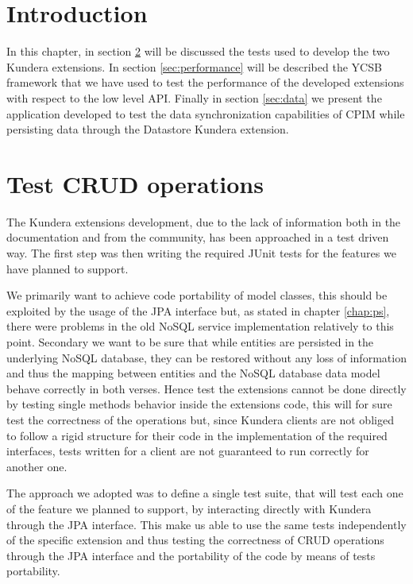 \section{Introduction}
In this chapter, in section \ref{sec:crud} will be discussed the tests used to develop the two Kundera extensions.
In section \ref{sec:performance} will be described the YCSB framework that we have used to test the performance of the developed extensions with respect to the low level API.
Finally in section \ref{sec:data} we present the application developed to test the data synchronization capabilities of CPIM while persisting data through the Datastore Kundera extension. 

\section{Test CRUD operations}
\label{sec:crud}
The Kundera extensions development, due to the lack of information both in the documentation and from the community, has been approached in a test driven way.
The first step was then writing the required JUnit tests for the features we have planned to support.

\newparagraph We primarily want to achieve code portability of model classes, this should be exploited by the usage of the JPA interface but, as stated in chapter \ref{chap:ps}, there were problems in the old NoSQL service implementation relatively to this point.
Secondary we want to be sure that while entities are persisted in the underlying NoSQL database, they can be restored without any loss of information and thus the mapping between entities and the NoSQL database data model behave correctly in both verses.
Hence test the extensions cannot be done directly by testing single methods behavior inside the extensions code, this will for sure test the correctness of the operations but, since Kundera clients are not obliged to follow a rigid structure for their code in the implementation of the required interfaces, tests written for a client are not guaranteed to run correctly for another one. 

\noindent The approach we adopted was to define a single test suite, that will test each one of the feature we planned to support, by interacting directly with Kundera through the JPA interface. This make us able to use the same tests independently of the specific extension and thus testing the correctness of CRUD operations through the JPA interface and the portability of the code by means of tests portability.

